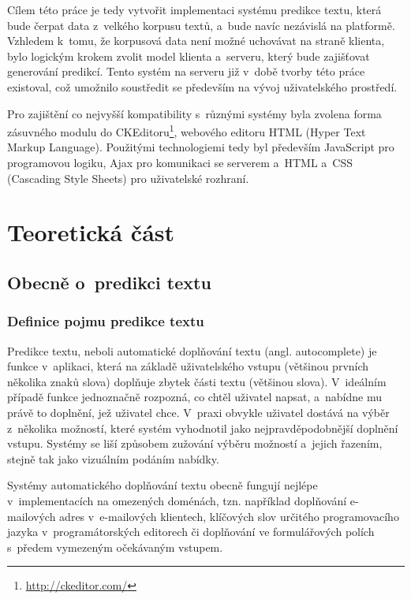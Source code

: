 \documentclass[a4paper,11pt,openany]{book} %
\begin{document}
Cílem této práce je tedy vytvořit implementaci systému predikce textu, která bude čerpat data z~velkého korpusu textů, a~bude navíc nezávislá na platformě. Vzhledem k~tomu, že korpusová data není možné uchovávat na straně klienta, bylo logickým krokem zvolit model klienta a~serveru, který bude zajišťovat generování predikcí. Tento systém na serveru již v~době tvorby této práce existoval, což umožnilo soustředit se především na vývoj uživatelského prostředí. 

Pro zajištění co nejvyšší kompatibility s~různými systémy byla zvolena forma zásuvného modulu do CKEditoru\footnote{\url{http://ckeditor.com/}}, webového editoru HTML (Hyper Text Markup Language). Použitými technologiemi tedy byl především JavaScript pro programovou logiku, Ajax pro komunikaci se serverem a~HTML a~CSS (Cascading Style Sheets) pro uživatelské rozhraní.

\restoregeometry

\part{Teoretická část}
\pagestyle{sensible}

\chapter{Obecně o~predikci textu}

\section{Definice pojmu predikce textu}

Predikce textu, neboli automatické doplňování textu (angl. autocomplete) je funkce v~aplikaci, která na základě uživatelského vstupu (většinou prvních několika znaků slova) doplňuje zbytek části textu (většinou slova). V~ideálním případě funkce jednoznačně rozpozná, co chtěl uživatel napsat, a~nabídne mu právě to doplnění, jež uživatel chce. V~praxi obvykle uživatel dostává na výběr z~několika možností, které systém vyhodnotil jako nejpravděpodobnější doplnění vstupu. Systémy se liší způsobem zužování výběru možností a~jejich řazením, stejně tak jako vizuálním podáním nabídky.

Systémy automatického doplňování textu obecně fungují nejlépe v~implementacích na omezených doménách, tzn. například doplňování e-mailových adres v~e-mailových klientech, klíčových slov určitého programovacího jazyka v~programátorských editorech či doplňování ve formulářových polích s~předem vymezeným očekávaným vstupem. 
\end{document}
